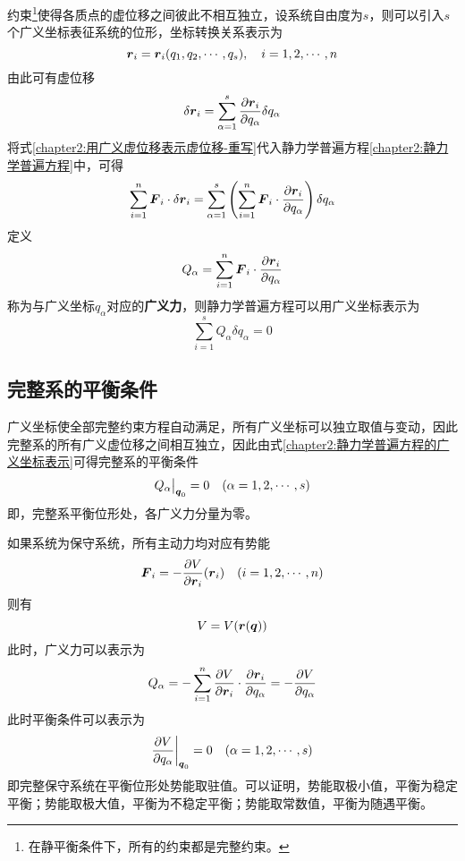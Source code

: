 约束\footnote{在静平衡条件下，所有的约束都是完整约束。}使得各质点的虚位移之间彼此不相互独立，设系统自由度为$s$，则可以引入$s$个广义坐标表征系统的位形，坐标转换关系表示为
\begin{equation}
	\boldsymbol{r}_i = \boldsymbol{r}_i(q_1,q_2,\cdots,q_s),\quad i = 1,2,\cdots,n
\end{equation}
由此可有虚位移
\begin{equation}
	\delta \boldsymbol{r}_i = \sum_{\alpha=1}^s \frac{\partial \boldsymbol{r}_i}{\partial q_\alpha} \delta q_\alpha
	\label{chapter2:用广义虚位移表示虚位移-重写}
\end{equation}
将式\eqref{chapter2:用广义虚位移表示虚位移-重写}代入静力学普遍方程\eqref{chapter2:静力学普遍方程}中，可得
\begin{equation*}
	\sum_{i=1}^n \boldsymbol{F}_i \cdot \delta \boldsymbol{r}_i = \sum_{\alpha=1}^s \left(\sum_{i=1}^n \boldsymbol{F}_i \cdot \frac{\partial \boldsymbol{r}_i}{\partial q_\alpha}\right)\delta q_\alpha
\end{equation*}
定义
\begin{equation}
	Q_\alpha = \sum_{i=1}^n \boldsymbol{F}_i \cdot \frac{\partial \boldsymbol{r}_i}{\partial q_\alpha}
	\label{chapter2:广义力的定义式}
\end{equation}
称为与广义坐标$q_\alpha$对应的{\bf 广义力}，则静力学普遍方程可以用广义坐标表示为
\begin{equation}
	\sum_{i=1}^s Q_\alpha \delta q_\alpha = 0
	\label{chapter2:静力学普遍方程的广义坐标表示}
\end{equation}

\subsection{完整系的平衡条件}

广义坐标使全部完整约束方程自动满足，所有广义坐标可以独立取值与变动，因此完整系的所有广义虚位移之间相互独立，因此由式\eqref{chapter2:静力学普遍方程的广义坐标表示}可得完整系的平衡条件
\begin{equation}
	Q_\alpha\big|_{\boldsymbol{q}_0} = 0 \quad (\alpha =1,2,\cdots,s)
\end{equation}
即，完整系平衡位形处，各广义力分量为零。

如果系统为保守系统，所有主动力均对应有势能
\begin{equation}
	\boldsymbol{F}_i = -\frac{\partial V}{\partial \boldsymbol{r}_i}(\boldsymbol{r}_i) \quad (i=1,2,\cdots,n)
\end{equation}
则有
\begin{equation*}
	V = V(\boldsymbol{r}(\boldsymbol{q}))
\end{equation*}
此时，广义力可以表示为
\begin{equation}
	Q_\alpha = -\sum_{i=1}^n \frac{\partial V}{\partial \boldsymbol{r}_i} \cdot \frac{\partial \boldsymbol{r}_i}{\partial q_\alpha} = -\frac{\partial V}{\partial q_\alpha}
\end{equation}
此时平衡条件可以表示为
\begin{equation}
	\frac{\partial V}{\partial q_\alpha}\bigg|_{\boldsymbol{q}_0} = 0 \quad (\alpha = 1,2,\cdots,s)
\end{equation}
即完整保守系统在平衡位形处势能取驻值。可以证明，势能取极小值，平衡为{\heiti 稳定平衡}；势能取极大值，平衡为{\heiti 不稳定平衡}；势能取常数值，平衡为{\heiti 随遇平衡}。

